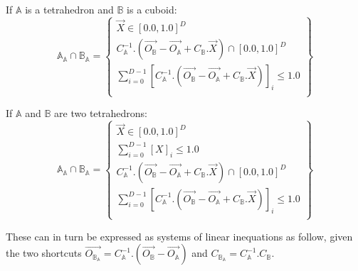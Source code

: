 \documentclass[12pt, a4paper]{article}
\begin{document}
If $\mathbb{A}$ is a tetrahedron and $\mathbb{B}$ is a cuboid:
\begin{equation}
\mathbb{A}_\mathbb{A}\cap\mathbb{B}_\mathbb{A}=\left\lbrace
\begin{array}{c}
\overrightarrow{X}\in[0.0,1.0]^D\\
C_\mathbb{A}^{-1}.\left(\overrightarrow{O_\mathbb{B}}-\overrightarrow{O_\mathbb{A}}+C_\mathbb{B}.\overrightarrow{X}\right)\cap[0.0,1.0]^D\\
\sum_{i=0}^{D-1}\left[C_\mathbb{A}^{-1}.\left(\overrightarrow{O_\mathbb{B}}-\overrightarrow{O_\mathbb{A}}+C_\mathbb{B}.\overrightarrow{X}\right)\right]_i\le1.0\\
\end{array}
\right\rbrace
\end{equation}

If $\mathbb{A}$ and $\mathbb{B}$ are two tetrahedrons:
\begin{equation}
\mathbb{A}_\mathbb{A}\cap\mathbb{B}_\mathbb{A}=\left\lbrace
\begin{array}{c}
\overrightarrow{X}\in[0.0,1.0]^D\\
\sum_{i=0}^{D-1}\left[X\right]_i\le1.0\\
C_\mathbb{A}^{-1}.(\overrightarrow{O_\mathbb{B}}-\overrightarrow{O_\mathbb{A}}+C_\mathbb{B}.\overrightarrow{X})\cap[0.0,1.0]^D\\
\sum_{i=0}^{D-1}\left[C_\mathbb{A}^{-1}.\left(\overrightarrow{O_\mathbb{B}}-\overrightarrow{O_\mathbb{A}}+C_\mathbb{B}.\overrightarrow{X}\right)\right]_i\le1.0\\
\end{array}
\right\rbrace
\end{equation}

These can in turn be expressed as systems of linear inequations as follow, given the two shortcuts $\overrightarrow{O_{\mathbb{B}_\mathbb{A}}}=C_\mathbb{A}^{-1}.(\overrightarrow{O_\mathbb{B}}-\overrightarrow{O_\mathbb{A}})$ and $C_{\mathbb{B}_\mathbb{A}}=C_\mathbb{A}^{-1}.C_{\mathbb{B}}$.
\end{document}
